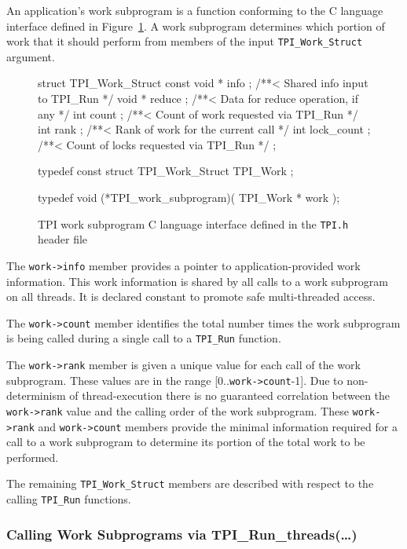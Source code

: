 An application's work subprogram is a function conforming to the C language interface defined in Figure~\ref{fig:WorkSubprogram}.
%
A work subprogram determines which portion of work that it should perform from members of the input
\texttt{TPI\_Work\_Struct} argument.
%
\begin{figure}[h]
\center
\small
\begin{boxedverbatim}
struct TPI_Work_Struct {
  const void * info ;       /**< Shared info input to TPI_Run         */
  void       * reduce ;     /**< Data for reduce operation, if any    */
  int          count ;      /**< Count of work requested via TPI_Run  */
  int          rank ;       /**< Rank  of work for the current call   */
  int          lock_count ; /**< Count of locks requested via TPI_Run */
};

typedef const struct TPI_Work_Struct TPI_Work ;

typedef void (*TPI_work_subprogram)( TPI_Work * work );
\end{boxedverbatim}
\caption{TPI work subprogram C language interface defined in the \texttt{TPI.h} header file}
\label{fig:WorkSubprogram}
\end{figure}
%
\begin{blist}
\item The \texttt{work->info} member provides a pointer to application-provided work information.  This work information is shared by all calls to a work subprogram on all threads.  It is declared constant to promote safe multi-threaded access.
%
\item The \texttt{work->count} member identifies the total number times the work subprogram is being called during a single call to a \texttt{TPI\_Run} function.
%
\item The \texttt{work->rank} member is given a unique value for each call of the work subprogram.  These values are in the range \mbox{[0..\texttt{work->count}-1]}.
Due to non-determinism of thread-execution there is no guaranteed correlation between the
\texttt{work->rank} value and the calling order of the work subprogram.
These \texttt{work->rank} and \texttt{work->count} members provide the minimal information required for a call to a work subprogram to determine its portion of the total work to be performed.
%
\end{blist}
%
The remaining \texttt{TPI\_Work\_Struct} members are described with respect to the calling \texttt{TPI\_Run} functions.

\clearpage
\subsubsection{Calling Work Subprograms via TPI\_Run\_threads(\ldots)}

